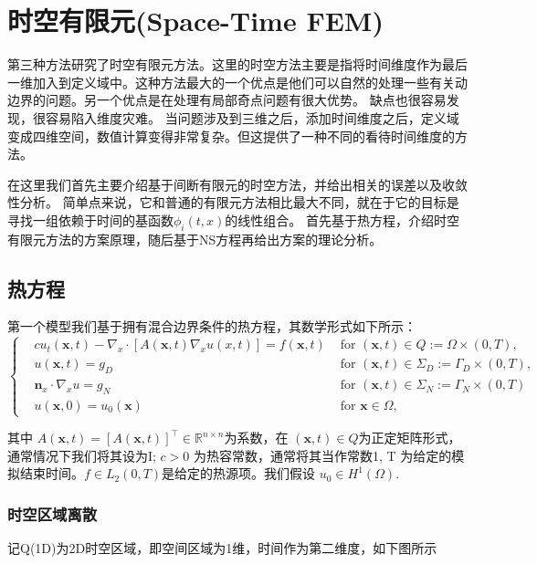 \section{时空有限元(Space-Time FEM)}
第三种方法研究了时空有限元方法\cite{STM}。这里的时空方法主要是指将时间维度作为最后一维加入到定义域中。这种方法最大的一个优点是他们可以自然的处理一些有关动边界的问题。另一个优点是在处理有局部奇点问题有很大优势。
缺点也很容易发现，很容易陷入维度灾难。 当问题涉及到三维之后，添加时间维度之后，定义域变成四维空间，数值计算变得非常复杂。但这提供了一种不同的看待时间维度的方法。

在这里我们首先主要介绍基于间断有限元的时空方法，并给出相关的误差以及收敛性分析。
简单点来说，它和普通的有限元方法相比最大不同，就在于它的目标是寻找一组依赖于时间的基函数${\phi_i(t,x)}$的线性组合。
首先基于热方程，介绍时空有限元方法的方案原理，随后基于NS方程再给出方案的理论分析。

\subsection{热方程}
第一个模型我们基于拥有混合边界条件的热方程，其数学形式如下所示：
$$\left\{\begin{aligned}
&c  u_t(\textbf{x}, t)-\nabla_x \cdot\left[A(\textbf{x}, t) \nabla_x u(x, t)\right]  =f(\textbf{x}, t) & \text { for }(\textbf{x}, t) \in Q:=\Omega \times(0, T), \\
&u(\textbf{x}, t) =g_D  & \text { for }(\textbf{x}, t) \in \Sigma_D:=\Gamma_D \times(0, T), \\
&\textbf{n}_x\cdot \nabla_xu=g_N & \text{ for } (\textbf{x}, t) \in \Sigma_N:=\Gamma_N \times(0, T)\\
&u(\textbf{x}, 0) =u_{0}(\textbf{x})  & \text { for } \textbf{x} \in \Omega,
\end{aligned}\right.$$

其中  $A(\textbf{x}, t)=[A(\textbf{x}, t)]^{\top} \in \mathbb{R}^{n \times n}$为系数，在  $(\textbf{x}, t) \in Q $为正定矩阵形式，通常情况下我们将其设为I; 
$c>0$ 为热容常数，通常将其当作常数1, T 为给定的模拟结束时间。$f \in L_{2}\left(0, T\right)$是给定的热源项。我们假设 $u_{0} \in H^{1}(\Omega)$.

\subsubsection*{时空区域离散}
记Q(1D)为2D时空区域，即空间区域为1维，时间作为第二维度，如下图所示

\begin{center}
\end{center}


